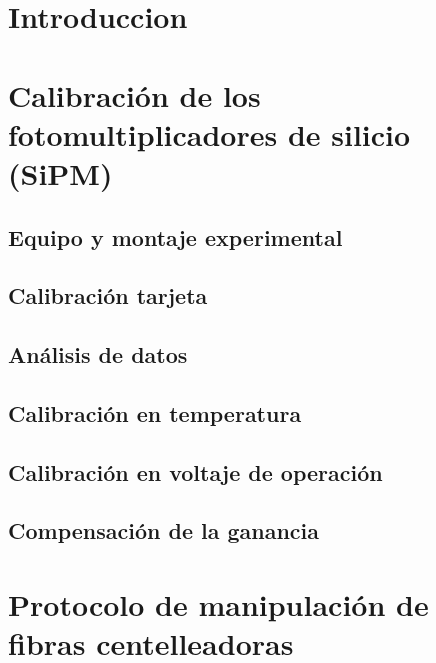 \documentclass[11pt,a4paper]{article}
\begin{document}


%

\tableofcontents
\newpage


\section{Introduccion}  \label{sec:ch01}


\section{Calibración de los fotomultiplicadores de silicio (SiPM)} \label{sec:ch02}

	\subsection{Equipo y montaje experimental}
	
	
	\subsection{Calibración tarjeta}
	
	
	\subsection{Análisis de datos}
	
	
	\subsection{Calibración en temperatura}
	

	\subsection{Calibración en voltaje de operación}
	
	
	\subsection{Compensación de la ganancia}
	


\section{Protocolo de manipulación de fibras centelleadoras} \label{sec:ch03}

\end{document}
